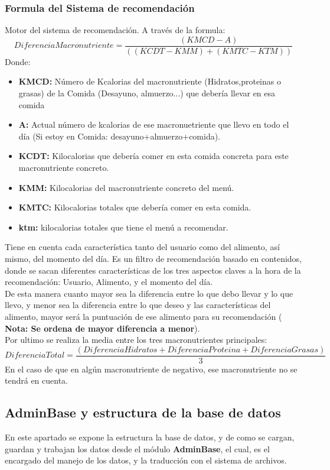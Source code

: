 \subsubsection{Formula del Sistema de recomendación}
Motor del sistema de recomendación. A través de la formula:
\begin{equation}
DiferenciaMacronutriente = \frac{(KMCD - A)}{((KCDT-KMM)+(KMTC-KTM))}
\end{equation}
Donde:
\begin{itemize}
\item \textbf{KMCD:} Número de Kcalorias del macronutriente (Hidratos,proteinas o grasas) de la Comida (Desayuno, almuerzo...) que debería llevar en esa comida
\item \textbf{A:} Actual número de kcalorias de ese macronuetriente que llevo en todo el día (Si estoy en Comida: desayuno+almuerzo+comida).
\item \textbf{KCDT:} Kilocalorias que debería comer en esta comida concreta para este macronutriente concreto.
\item \textbf{KMM:} Kilocalorias del macronutriente concreto del menú.
\item \textbf{KMTC:} Kilocalorias totales que debería comer en esta comida.
\item \textbf{ktm:} kilocalorias totales que tiene el menú a recomendar.

\end{itemize}
Tiene en cuenta cada característica tanto del usuario como del alimento, así mismo, del momento del día. Es un filtro de recomendación basado en contenidos, donde se sacan diferentes características de los tres aspectos claves a la hora de la recomendación: Usuario, Alimento, y el momento del día.\\
De esta manera cuanto mayor sea la diferencia entre lo que debo llevar y lo que llevo, y menor sea la diferencia entre lo que deseo y las características del alimento, mayor será la puntuación de ese alimento para su recomendación ( \textbf{Nota: Se ordena de mayor diferencia a menor}).\\
Por ultimo se realiza la media entre los tres macronutrientes principales:
\begin{equation}
DiferenciaTotal = \frac{(DiferenciaHidratos+DiferenciaProteina+DiferenciaGrasas)}{3}
\end{equation} 
En el caso de que en algún macronutriente de negativo, ese macronutriente no se tendrá en cuenta.


\subsection{AdminBase y estructura de la base de datos}
En este apartado se expone la estructura la base de datos, y de como se cargan, guardan y  trabajan los datos desde el módulo \textbf{AdminBase}, el cual, es el encargado del manejo de los datos, y la traducción con el sistema de archivos.
